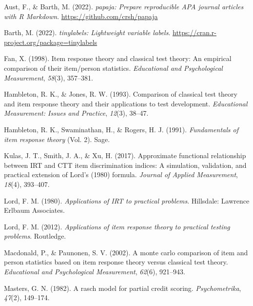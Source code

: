 \documentclass[
  man]{apa6}
\newlength{\cslhangindent}
\newlength{\cslentryspacingunit} %
\newenvironment{CSLReferences}[2] %
 {%
  \setlength{\parindent}{0pt}
  \ifodd #1
  \let\oldpar\par
  \def\par{\hangindent=\cslhangindent\oldpar}
  \fi
  \setlength{\parskip}{#2\cslentryspacingunit}
 }%
 {}
\begin{document}
\hypertarget{refs}{}
\begin{CSLReferences}{1}{0}
\leavevmode{}%
Aust, F., \& Barth, M. (2022). \emph{{papaja}: {Prepare} reproducible {APA} journal articles with {R Markdown}}. \url{https://github.com/crsh/papaja}

\leavevmode{}%
Barth, M. (2022). \emph{{tinylabels}: Lightweight variable labels}. \url{https://cran.r-project.org/package=tinylabels}

\leavevmode{}%
Fan, X. (1998). Item response theory and classical test theory: An empirical comparison of their item/person statistics. \emph{Educational and Psychological Measurement}, \emph{58}(3), 357--381.

\leavevmode{}%
Hambleton, R. K., \& Jones, R. W. (1993). Comparison of classical test theory and item response theory and their applications to test development. \emph{Educational Measurement: Issues and Practice}, \emph{12}(3), 38--47.

\leavevmode{}%
Hambleton, R. K., Swaminathan, H., \& Rogers, H. J. (1991). \emph{Fundamentals of item response theory} (Vol. 2). Sage.

\leavevmode{}%
Kulas, J. T., Smith, J. A., \& Xu, H. (2017). Approximate functional relationship between IRT and CTT item discrimination indices: A simulation, validation, and practical extension of {Lord's} (1980) formula. \emph{Journal of Applied Measurement}, \emph{18}(4), 393--407.

\leavevmode{}%
Lord, F. M. (1980). \emph{Applications of IRT to practical problems}. Hillsdale: Lawrence Erlbaum Associates.

\leavevmode{}%
Lord, F. M. (2012). \emph{Applications of item response theory to practical testing problems}. Routledge.

\leavevmode{}%
Macdonald, P., \& Paunonen, S. V. (2002). A monte carlo comparison of item and person statistics based on item response theory versus classical test theory. \emph{Educational and Psychological Measurement}, \emph{62}(6), 921--943.

\leavevmode{}%
Masters, G. N. (1982). A rasch model for partial credit scoring. \emph{Psychometrika}, \emph{47}(2), 149--174.


\end{CSLReferences}
\end{document}
